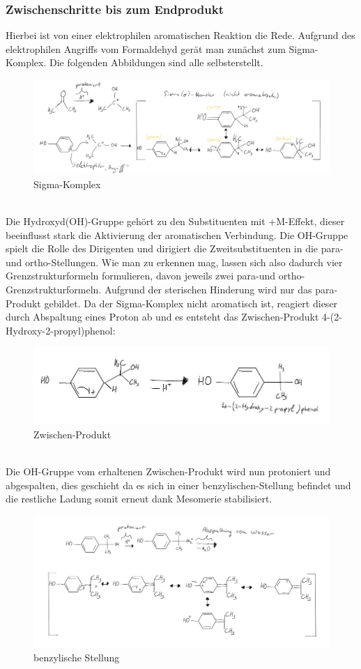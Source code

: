 \subsubsection{Zwischenschritte bis zum Endprodukt}
Hierbei ist von einer elektrophilen aromatischen Reaktion die Rede. Aufgrund des elektrophilen \glqq Angriffs\grqq{} vom Formaldehyd gerät man zunächst zum Sigma-Komplex. Die folgenden Abbildungen sind alle selbsterstellt.
\begin{figure}[htpb]
    \centering
    \includegraphics[width=.75\textwidth]{Sigma.jpg}
    \caption{Sigma-Komplex}
\end{figure}
\\Die Hydroxyd(OH)-Gruppe gehört zu den Substituenten mit +M-Effekt, dieser beeinflusst stark die \glqq Aktivierung\grqq{} der aromatischen Verbindung. Die OH-Gruppe spielt die Rolle des Dirigenten und dirigiert die Zweitsubstituenten in die para- und ortho-Stellungen. Wie man zu erkennen mag, lassen sich also dadurch vier Grenzstrukturformeln formulieren, davon jeweils zwei para-und ortho-Grenzstrukturformeln. Aufgrund der sterischen Hinderung wird nur das para-Produkt gebildet. Da der Sigma-Komplex nicht aromatisch ist, reagiert dieser durch Abspaltung eines Proton ab und es entsteht das Zwischen-Produkt 4-(2-Hydroxy-2-propyl)phenol\cite{Herstellung}:
\begin{figure}[htpb]
    \centering
    \includegraphics[width=.75\textwidth]{Zwischenprodukt.jpg}
    \caption{Zwischen-Produkt}
\end{figure}
\\Die OH-Gruppe vom erhaltenen Zwischen-Produkt wird nun protoniert und abgespalten, dies geschieht da es sich in einer \glqq benzylischen-Stellung\grqq{} befindet und die restliche Ladung somit erneut dank Mesomerie stabilisiert.
\begin{figure}[htpb]
    \centering
    \includegraphics[width=.8\textwidth]{mesomerie.jpg}
    \caption{benzylische Stellung}
\end{figure}
